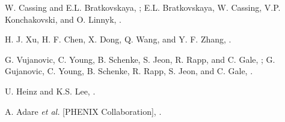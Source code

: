 \documentclass[twocolumn,showpacs,amsmath,amssymb,superscriptaddress,nofootinbib]{revtex4-1}
\begin{document}
\begin{thebibliography}{999}
 W. Cassing and E.L. Bratkovskaya, ; E.L. Bratkovskaya, W. Cassing, V.P. Konchakovski, and O. Linnyk,  .

 H. J. Xu, H. F. Chen, X. Dong, Q. Wang, and Y. F. Zhang, .

 G. Vujanovic, C. Young, B. Schenke, S. Jeon, R. Rapp, and C. Gale, ; G. Gujanovic, C. Young, B. Schenke, R. Rapp, S. Jeon, and C. Gale, .


 U. Heinz and K.S. Lee, .



 A. Adare {\it et al.} [PHENIX Collaboration], .


\end{thebibliography}
\end{document}
